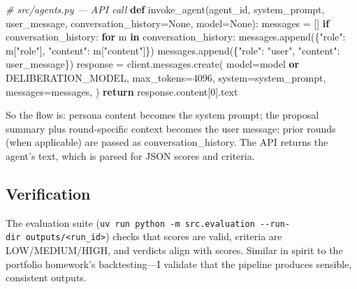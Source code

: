 \documentclass[
  11pt,
]{article}
\newenvironment{Shaded}{}{}
\newcommand{\CommentTok}[1]{\textcolor[rgb]{0.38,0.63,0.69}{\textit{#1}}}
\newcommand{\ControlFlowTok}[1]{\textcolor[rgb]{0.00,0.44,0.13}{\textbf{#1}}}
\newcommand{\DecValTok}[1]{\textcolor[rgb]{0.25,0.63,0.44}{#1}}
\newcommand{\KeywordTok}[1]{\textcolor[rgb]{0.00,0.44,0.13}{\textbf{#1}}}
\newcommand{\NormalTok}[1]{#1}
\newcommand{\OperatorTok}[1]{\textcolor[rgb]{0.40,0.40,0.40}{#1}}
\newcommand{\StringTok}[1]{\textcolor[rgb]{0.25,0.44,0.63}{#1}}
\newcommand{\VariableTok}[1]{\textcolor[rgb]{0.10,0.09,0.49}{#1}}
\begin{document}
\begin{Shaded}
\begin{Highlighting}[]
\CommentTok{\# src/agents.py — API call}
\KeywordTok{def}\NormalTok{ invoke\_agent(agent\_id, system\_prompt, user\_message, conversation\_history}\OperatorTok{=}\VariableTok{None}\NormalTok{, model}\OperatorTok{=}\VariableTok{None}\NormalTok{):}
\NormalTok{    messages }\OperatorTok{=}\NormalTok{ []}
    \ControlFlowTok{if}\NormalTok{ conversation\_history:}
        \ControlFlowTok{for}\NormalTok{ m }\KeywordTok{in}\NormalTok{ conversation\_history:}
\NormalTok{            messages.append(\{}\StringTok{"role"}\NormalTok{: m[}\StringTok{"role"}\NormalTok{], }\StringTok{"content"}\NormalTok{: m[}\StringTok{"content"}\NormalTok{]\})}
\NormalTok{    messages.append(\{}\StringTok{"role"}\NormalTok{: }\StringTok{"user"}\NormalTok{, }\StringTok{"content"}\NormalTok{: user\_message\})}
\NormalTok{    response }\OperatorTok{=}\NormalTok{ client.messages.create(}
\NormalTok{        model}\OperatorTok{=}\NormalTok{model }\KeywordTok{or}\NormalTok{ DELIBERATION\_MODEL,}
\NormalTok{        max\_tokens}\OperatorTok{=}\DecValTok{4096}\NormalTok{,}
\NormalTok{        system}\OperatorTok{=}\NormalTok{system\_prompt,}
\NormalTok{        messages}\OperatorTok{=}\NormalTok{messages,}
\NormalTok{    )}
    \ControlFlowTok{return}\NormalTok{ response.content[}\DecValTok{0}\NormalTok{].text}
\end{Highlighting}
\end{Shaded}

So the flow is: persona content becomes the system prompt; the proposal
summary plus round-specific context becomes the user message; prior
rounds (when applicable) are passed as conversation\_history. The API
returns the agent's text, which is parsed for JSON scores and criteria.

\subsection{Verification}\label{verification}

The evaluation suite
(\texttt{uv\ run\ python\ -m\ src.evaluation\ -\/-run-dir\ outputs/\textless{}run\_id\textgreater{}})
checks that scores are valid, criteria are LOW/MEDIUM/HIGH, and verdicts
align with scores. Similar in spirit to the portfolio homework's
backtesting---I validate that the pipeline produces sensible, consistent
outputs.
\end{document}
